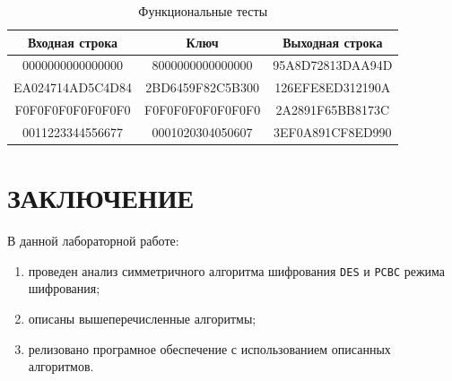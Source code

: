 \begin{table}[ht!]
	\begin{center}
		\captionsetup{justification=raggedright,singlelinecheck=off}
		\caption{\label{tbl:functional_test} Функциональные тесты}
		\begin{tabular}{|c|c|c|}
			\hline
			Входная строка & Ключ & Выходная строка \\ 
			\hline
			0000000000000000 & 8000000000000000 & 95A8D72813DAA94D \\
                        EA024714AD5C4D84 & 2BD6459F82C5B300 & 126EFE8ED312190A \\
			F0F0F0F0F0F0F0F0 & F0F0F0F0F0F0F0F0 & 2A2891F65BB8173C \\
                        0011223344556677 & 0001020304050607 & 3EF0A891CF8ED990 \\
			\hline
		\end{tabular}
	\end{center}
\end{table}

\clearpage
\section*{\large{ЗАКЛЮЧЕНИЕ}}
В данной лабораторной работе:

\begin{enumerate}
    \item проведен анализ симметричного алгоритма шифрования \texttt{DES} и \texttt{PCBC} режима шифрования;
    \item описаны вышеперечисленные алгоритмы;
    \item релизовано програмное обеспечение с использованием описанных алгоритмов.
\end{enumerate}
